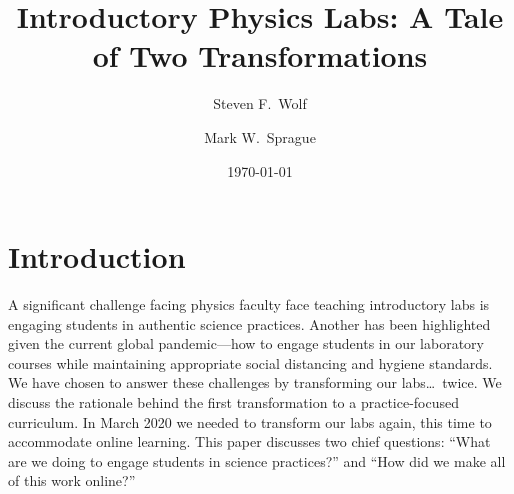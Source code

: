 \documentclass[aip, numerical, preprint]{revtex4-2}
\begin{document}
\title{Introductory Physics Labs: A Tale of Two Transformations}

\author{Steven F.\ Wolf}

\author{Mark W.\ Sprague}

\date{\today}


\maketitle

\section{Introduction}
A significant challenge facing physics faculty face teaching introductory labs is engaging
students in authentic science practices.\citep{national2007Rising,PCAST12,kozminski2014aapt}
Another has been highlighted given the current global pandemic---how to engage students in our
laboratory courses while maintaining appropriate social distancing and hygiene standards. We
have chosen to answer these challenges by transforming our labs\ldots\ twice. We discuss the
rationale behind the first transformation to a practice-focused curriculum.  In March 2020 we
needed to transform our labs again, this time to accommodate online learning. This paper
discusses two chief questions: ``What are we doing to engage students in science practices?''
and ``How did we make all of this work online?''
\end{document}
